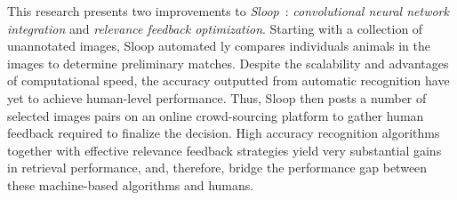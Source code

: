 This research presents two improvements to \emph{Sloop}~\cite{sloop15}:
\emph{convolutional neural network integration} and \emph{relevance feedback
optimization}. Starting with a collection of unannotated images, Sloop
automated ly compares individuals animals in the images to determine
preliminary matches. Despite the scalability and advantages of computational
speed, the accuracy	 outputted from automatic recognition have yet to achieve
human-level performance.  Thus, Sloop then posts a number of selected images
pairs on an online crowd-sourcing platform to gather human feedback required to
finalize the decision. High accuracy recognition algorithms together with
effective relevance feedback strategies yield very substantial gains in
retrieval performance, and, therefore, bridge the performance gap between these
machine-based algorithms and humans.
